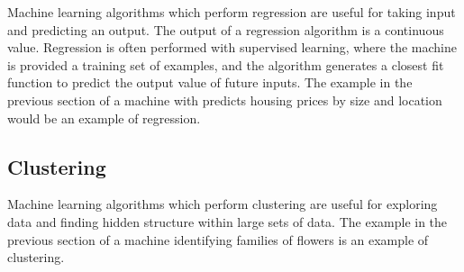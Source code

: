 Machine learning algorithms which perform regression are useful for taking input and predicting an output. The output of a regression algorithm is a continuous value. Regression is often performed with supervised learning, where the machine is provided a training set of examples, and the algorithm generates a closest fit function to predict the output value of future inputs. The example in the previous section of a machine with predicts housing prices by size and location would be an example of regression.


\subsection{Clustering} %

Machine learning algorithms which perform clustering are useful for exploring data and finding hidden structure within large sets of data. The example in the previous section of a machine identifying families of flowers is an example of clustering.

